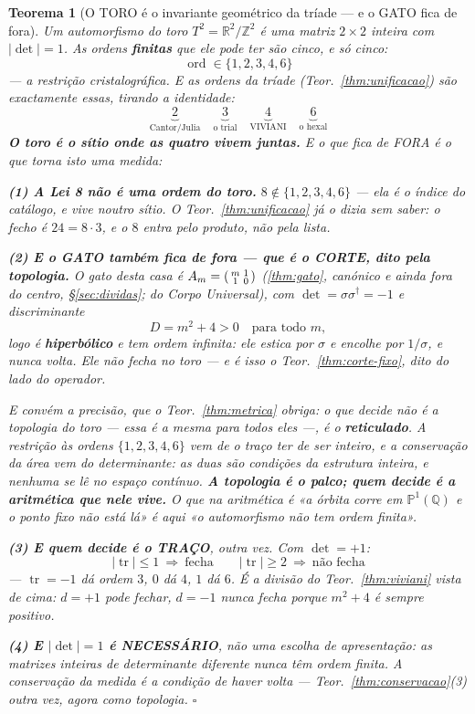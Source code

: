 \documentclass[11pt,a4paper]{article}
\newtheorem{teorema}{Teorema}
\newcommand{\abs}[1]{\lvert #1\rvert}
\newcommand{\dg}{^{\dagger}}
\begin{document}
\begin{teorema}[O TORO é o invariante geométrico da tríade --- e o GATO fica de
fora]\label{thm:toro}
Um automorfismo do toro $T^{2}=\mathbb{R}^{2}/\mathbb{Z}^{2}$ é uma matriz $2\times2$
\emph{inteira} com $\abs{\det}=1$. As ordens \textbf{finitas} que ele pode ter são cinco,
e só cinco:
\[
\boxed{\;\operatorname{ord}\in\{1,2,3,4,6\}\;}
\]
--- a restrição cristalográfica. E as ordens da tríade (Teor.~\ref{thm:unificacao}) são
\emph{exactamente} essas, tirando a identidade:
\[
\underbrace{2}_{\text{Cantor/Julia}}\quad
\underbrace{3}_{\text{o trial}}\quad
\underbrace{4}_{\text{VIVIANI}}\quad
\underbrace{6}_{\text{o hexal}}
\]
\textbf{O toro é o sítio onde as quatro vivem juntas.} E o que fica de FORA é o que torna
isto uma medida:

\textbf{(1) A Lei 8 não é uma ordem do toro.} $8\notin\{1,2,3,4,6\}$ --- ela é o
\emph{índice} do catálogo, e vive noutro sítio. O Teor.~\ref{thm:unificacao} já o dizia
sem saber: o fecho é $24=8\cdot3$, e o $8$ entra pelo produto, não pela lista.

\textbf{(2) E o GATO também fica de fora --- que é o CORTE, dito pela topologia.} O gato
desta casa é $A_m=\begin{psmallmatrix}m&1\\1&0\end{psmallmatrix}$ (\ref{thm:gato}, canónico e ainda fora do centro, \S\ref{sec:dividas}; do
\emph{Corpo Universal}), com $\det=\sigma\sigma\dg=-1$ e discriminante
\[
D=m^{2}+4>0\quad\text{para todo }m,
\]
logo é \textbf{hiperbólico} e tem ordem \emph{infinita}: ele estica por $\sigma$ e
encolhe por $1/\sigma$, e nunca volta. \emph{Ele não fecha no toro} --- e é isso o
Teor.~\ref{thm:corte-fixo}, dito do lado do operador.

\emph{E convém a precisão, que o Teor.~\ref{thm:metrica} obriga}: o que decide não é a
topologia do toro --- essa é a mesma para todos eles ---, é o \textbf{reticulado}. A
restrição às ordens $\{1,2,3,4,6\}$ vem de o traço ter de ser \emph{inteiro}, e a
conservação da área vem do \emph{determinante}: as duas são condições da estrutura
inteira, e nenhuma se lê no espaço contínuo. \textbf{A topologia é o palco; quem decide é
a aritmética que nele vive.} O que na aritmética é «a órbita corre
em $\mathbb{P}^1(\mathbb{Q})$ e o ponto fixo não está lá» é aqui «o automorfismo não tem
ordem finita».

\textbf{(3) E quem decide é o TRAÇO}, outra vez. Com $\det=+1$:
\[
\abs{\operatorname{tr}}\le1\ \Rightarrow\ \text{fecha}\qquad
\abs{\operatorname{tr}}\ge2\ \Rightarrow\ \text{não fecha}
\]
--- $\operatorname{tr}=-1$ dá ordem $3$, $0$ dá $4$, $1$ dá $6$. É a divisão do
Teor.~\ref{thm:viviani} vista de cima: $d=+1$ pode fechar, $d=-1$ nunca fecha porque
$m^{2}+4$ é sempre positivo.

\textbf{(4) E $\abs{\det}=1$ é NECESSÁRIO}, não uma escolha de apresentação: as matrizes
inteiras de determinante diferente \emph{nunca} têm ordem finita. \emph{A conservação da
medida é a condição de haver volta} --- Teor.~\ref{thm:conservacao}(3) outra vez, agora
como topologia. $\square$
\end{teorema}
\end{document}
